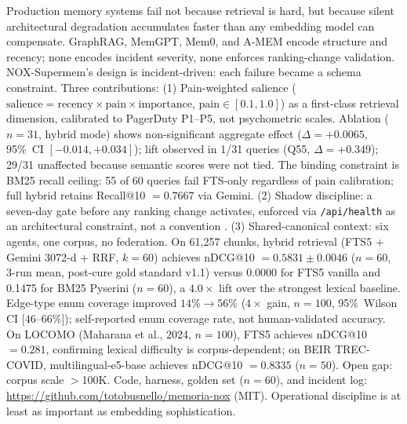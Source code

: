 
Production memory systems fail not because retrieval is hard, but because silent
architectural degradation accumulates faster than any embedding model can compensate.
GraphRAG, MemGPT, Mem0, and A-MEM encode structure and recency; none encodes incident
severity, none enforces ranking-change validation. NOX-Supermem's design is
incident-driven: each failure became a schema constraint. Three contributions: (1)
Pain-weighted salience
($\text{salience} = \text{recency} \times \text{pain} \times \text{importance}$,
$\text{pain} \in [0.1, 1.0]$) as a first-class retrieval dimension, calibrated to
PagerDuty P1--P5, not psychometric scales. Ablation
($n=31$, hybrid mode) shows non-significant aggregate effect ($\Delta = +0.0065$, 95\%~CI
$[-0.014, +0.034]$); lift observed in 1/31 queries (Q55, $\Delta = +0.349$); 29/31
unaffected because semantic scores were not tied. The binding constraint
is BM25 recall ceiling: 55 of 60 queries fail
FTS-only regardless of pain calibration; full hybrid retains Recall@10 $= 0.7667$ via
Gemini. (2) Shadow discipline: a seven-day gate before any
ranking change activates, enforced via \texttt{/api/health} as an architectural
constraint, not a convention \cite{kohavi2020trustworthy,chapelle2012interleaved}. (3)
Shared-canonical context: six agents, one corpus, no federation. On 61,257 chunks, hybrid
retrieval (FTS5 + Gemini 3072-d + RRF, $k=60$) achieves
nDCG@10 $= 0.5831 \pm 0.0046$ ($n=60$, 3-run mean, post-cure gold standard v1.1) versus 0.0000 for FTS5 vanilla and
0.1475 for BM25 Pyserini ($n=60$), a $4.0\times$ lift over the strongest lexical baseline.
Edge-type enum coverage improved $14\% \to 56\%$ ($4\times$ gain, $n=100$, 95\%~Wilson
CI $[46$--$66\%]$); self-reported enum coverage rate, not human-validated accuracy. On
LOCOMO (Maharana et al., 2024, $n=100$), FTS5 achieves nDCG@10 $= 0.281$, confirming
lexical difficulty is corpus-dependent; on BEIR TREC-COVID, multilingual-e5-base achieves
nDCG@10 $= 0.8335$ ($n=50$). Open gap: corpus scale $>$100K. Code,
harness, golden set ($n=60$), and incident log:
\url{https://github.com/totobusnello/memoria-nox} (MIT). Operational discipline is at
least as important as embedding sophistication.
